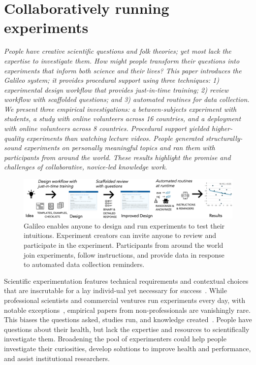 
\chapter{Collaboratively running experiments}

\textit{People have creative scientific questions and folk theories;
yet most lack the expertise to investigate them. How might
people transform their questions into experiments that
inform both science and their lives? This paper introduces
the Galileo system; it provides procedural support using
three techniques: 1) experimental design workflow that
provides just-in-time training; 2) review workflow with
scaffolded questions; and 3) automated routines for data
collection. We present three empirical investigations: a
between-subjects experiment with students, a study with
online volunteers across 16 countries, and a deployment
with online volunteers across 8 countries. Procedural
support yielded higher-quality experiments than watching
lecture videos. People generated structurally-sound experiments
on personally meaningful topics and ran them with
participants from around the world. These results highlight
the promise and challenges of collaborative, novice-led
knowledge work.}


\begin{figure}[h] 
  \centering
  \includegraphics[width=1.0\textwidth]{figures/galileo/galileo-1}
  \caption[]
{Galileo enables anyone to design and run experiments to test their intuitions. Experiment creators can invite anyone to review and participate in the experiment. Participants from around the world join experiments, follow instructions, and provide data in response to automated data collection reminders.}
  \label{fig:galileo-1}
\end{figure}

Scientific experimentation features technical requirements and contextual choices that are inscrutable for a lay individ-ual yet necessary for success~\cite{Martin2007}. While professional scientists and commercial ventures run experiments every day, with notable exceptions~\cite{Cooper2010, Lewis2016}, empirical papers from non-professionals are vanishingly rare. This biases the questions asked, studies run, and knowledge created~\cite{crawford2017politics,Henrich2010a}. People have questions about their health, but lack the expertise and resources to scientifically investigate them. Broadening the pool of experimenters could help people investigate their curiosities, develop solutions to improve health and performance, and assist institutional researchers.

